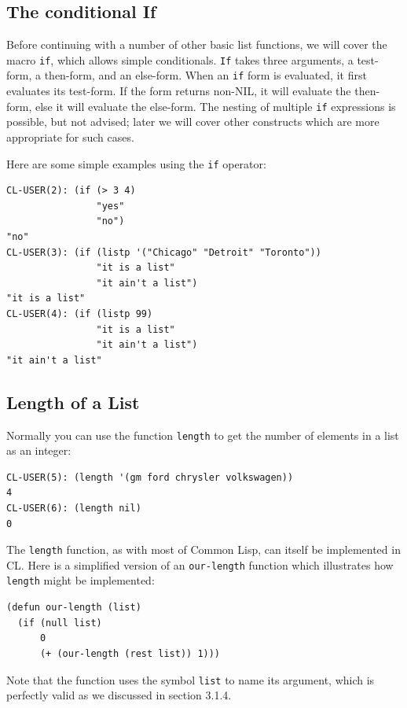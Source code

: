 \subsection{The conditional If}

Before continuing with a number of other basic list functions, we will cover the macro \texttt{if},
which allows simple conditionals. \texttt{If} takes three arguments, a test-form, a then-form, and
an else-form. When an \texttt{if} form is evaluated, it first evaluates its test-form. If the form
returns non-NIL, it will evaluate the then-form, else it will evaluate the else-form. The
nesting of multiple \texttt{if} expressions is possible, but not advised; later we will cover other
constructs which are more appropriate for such cases.

Here are some simple examples using the \texttt{if} operator:

\begin{verbatim}
CL-USER(2): (if (> 3 4)
                "yes"
                "no")
"no"
CL-USER(3): (if (listp '("Chicago" "Detroit" "Toronto"))
                "it is a list"
                "it ain't a list")
"it is a list"
CL-USER(4): (if (listp 99)
                "it is a list"
                "it ain't a list")
"it ain't a list"
\end{verbatim}

\subsection{Length of a List}

Normally you can use the function \texttt{length} to get the number of elements in a list as an
integer:

\begin{verbatim}
CL-USER(5): (length '(gm ford chrysler volkswagen))
4
CL-USER(6): (length nil)
0
\end{verbatim}

The \texttt{length} function, as with most of Common Lisp, can itself be implemented in CL. Here
is a simplified version of an \texttt{our-length} function which illustrates how \texttt{length} might be
implemented:

\begin{verbatim}
(defun our-length (list)
  (if (null list)
      0
      (+ (our-length (rest list)) 1)))
\end{verbatim}

Note that the function uses the symbol \texttt{list} to name its argument, which is perfectly valid
as we discussed in section 3.1.4.


